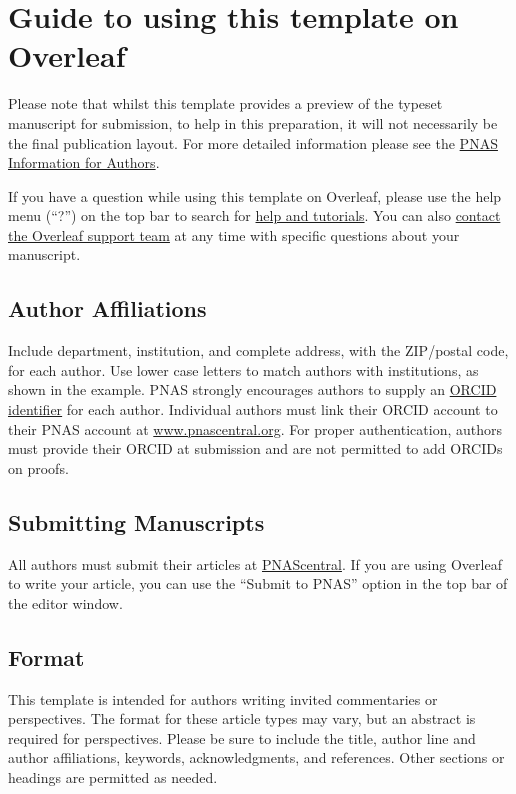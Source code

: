 \documentclass[9pt,twocolumn,twoside]{pnas-new}
\begin{document}
\section*{Guide to using this template on Overleaf}

Please note that whilst this template provides a preview of the typeset manuscript for submission, to help in this preparation, it will not necessarily be the final publication layout. For more detailed information please see the \href{ https://www.pnas.org/page/authors/format}{PNAS Information for Authors}.

If you have a question while using this template on Overleaf, please use the help menu (``?'') on the top bar to search for \href{https://www.overleaf.com/help}{help and tutorials}. You can also \href{https://www.overleaf.com/contact}{contact the Overleaf support team} at any time with specific questions about your manuscript.

\subsection*{Author Affiliations}

Include department, institution, and complete address, with the ZIP/postal code, for each author. Use lower case letters to match authors with institutions, as shown in the example. PNAS strongly encourages authors to supply an \href{https://orcid.org/}{ORCID identifier} for each author. Individual authors must link their ORCID account to their PNAS account at \href{http://www.pnascentral.org/}{www.pnascentral.org}. For proper authentication, authors must provide their ORCID at submission and are not permitted to add ORCIDs on proofs.

\subsection*{Submitting Manuscripts}

All authors must submit their articles at \href{http://www.pnascentral.org/cgi-bin/main.plex}{PNAScentral}. If you are using Overleaf to write your article, you can use the ``Submit to PNAS'' option in the top bar of the editor window.

\subsection*{Format}

This template is intended for authors writing invited commentaries or perspectives. The format for these article types may vary, but an abstract is required for perspectives. Please be sure to include the title, author line and author affiliations, keywords, acknowledgments, and references. Other sections or headings are permitted as needed.
\end{document}
